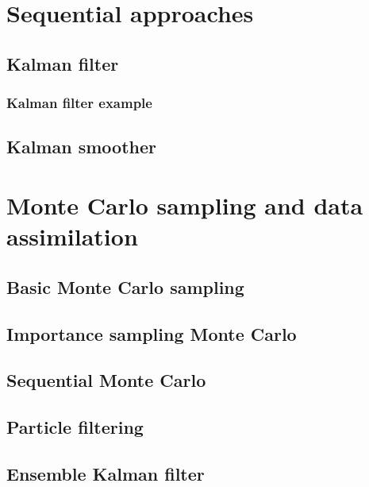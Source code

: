 \section{Sequential approaches}
\label{wikle:sequential}

\subsection{Kalman filter}
\label{wikle:sequential:kf}

\subsubsection{Kalman filter example}
\label{wikle:sequential:kf:ex}

\subsection{Kalman smoother}
\label{wikle:sequential:ks}

\section{Monte Carlo sampling and data assimilation}
\label{wikle:mc_da}

\subsection{Basic Monte Carlo sampling}
\label{wikle:mc_da:basic}

\subsection{Importance sampling Monte Carlo}
\label{wikle:mc_da:importance_sampling}

\subsection{Sequential Monte Carlo}
\label{wikle:mc_da:sequential}

\subsection{Particle filtering}
\label{wikle:mc_da:sequential:particle}

\subsection{Ensemble Kalman filter}
\label{wikle:mc_da:sequential:enkf}

